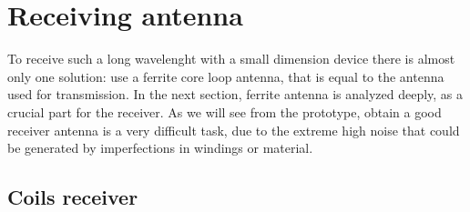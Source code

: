 \section{Receiving antenna}

To receive such a long wavelenght with a small dimension device there is almost only one solution: use a ferrite core loop antenna, that is equal to the antenna used for transmission\citep{winder2002newnes}. In the next section, ferrite antenna is analyzed deeply, as a crucial part for the receiver. As we will see from the prototype, obtain a good receiver antenna is a very difficult task, due to the extreme high noise that could be generated by imperfections in windings or material.

\subsection{Coils receiver}

